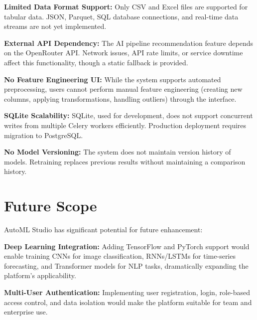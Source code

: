 \documentclass[12pt,a4paper]{report}
\begin{document}
\vspace{0.3cm}

\textbf{Limited Data Format Support:}
Only CSV and Excel files are supported for tabular data. JSON, Parquet, SQL database connections, and real-time data streams are not yet implemented.

\vspace{0.3cm}

\textbf{External API Dependency:}
The AI pipeline recommendation feature depends on the OpenRouter API. Network issues, API rate limits, or service downtime affect this functionality, though a static fallback is provided.

\vspace{0.3cm}

\textbf{No Feature Engineering UI:}
While the system supports automated preprocessing, users cannot perform manual feature engineering (creating new columns, applying transformations, handling outliers) through the interface.

\vspace{0.3cm}

\textbf{SQLite Scalability:}
SQLite, used for development, does not support concurrent writes from multiple Celery workers efficiently. Production deployment requires migration to PostgreSQL.

\vspace{0.3cm}

\textbf{No Model Versioning:}
The system does not maintain version history of models. Retraining replaces previous results without maintaining a comparison history.

\section{Future Scope}

AutoML Studio has significant potential for future enhancement:

\textbf{Deep Learning Integration:}
Adding TensorFlow and PyTorch support would enable training CNNs for image classification, RNNs/LSTMs for time-series forecasting, and Transformer models for NLP tasks, dramatically expanding the platform's applicability.

\vspace{0.3cm}

\textbf{Multi-User Authentication:}
Implementing user registration, login, role-based access control, and data isolation would make the platform suitable for team and enterprise use.
\end{document}
